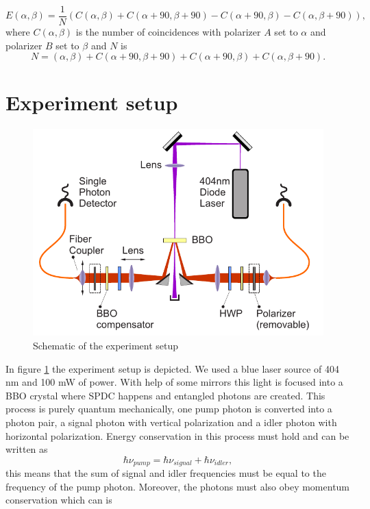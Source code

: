\documentclass[a4paper,10pt]{article}
\begin{document}
\begin{equation}\label{expectationvalue}E(\alpha,\beta) = \frac{1}{N}(C(\alpha,\beta)+C(\alpha+90,\beta+90)-C(\alpha+90,\beta)-C(\alpha,\beta+90)),\end{equation}
where $C(\alpha,\beta)$ is the number of coincidences with polarizer $A$ set to $\alpha$ and polarizer $B$ set to $\beta$ and $N$ is
\begin{equation}N = (\alpha,\beta)+C(\alpha+90,\beta+90)+C(\alpha+90,\beta)+C(\alpha,\beta+90).\end{equation}
\section{Experiment setup}
\begin{figure}[H]
\centering
\includegraphics[width=.9\textwidth]{img/setup}
\caption{Schematic of the experiment setup}\label{setup}
\end{figure}
In figure \ref{setup} the experiment setup is depicted. We used a blue laser source of 404 nm and 100 mW of power. With help of some mirrors this light is focused into a BBO crystal where SPDC happens and entangled photons are created. This process is purely quantum mechanically, one pump photon is converted into a photon pair, a signal photon with vertical polarization and a idler photon with horizontal polarization. Energy conservation in this process must hold and can be written as
\begin{equation}\hbar \nu_{pump} = \hbar \nu_{signal} + \hbar\nu_{idler},\end{equation}
this means that the sum of signal and idler frequencies must be equal to the frequency of the pump photon. Moreover, the photons must also obey momentum conservation which can is
\end{document}
